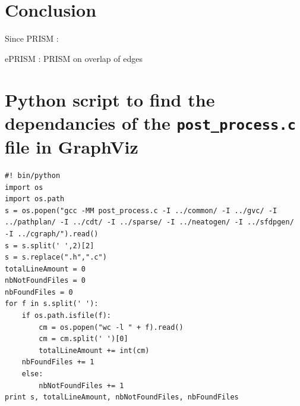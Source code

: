 \documentclass[12pt]{report}
\begin{document}
\chapter{Conclusion}

Since PRISM :

ePRISM : PRISM on overlap of edges \cite{Hu09}

\appendix
\chapter{Python script to find the dependancies of the \texttt{post\_process.c} file in GraphViz}

\begin{verbatim}
#! bin/python
import os
import os.path
s = os.popen("gcc -MM post_process.c -I ../common/ -I ../gvc/ -I 
../pathplan/ -I ../cdt/ -I ../sparse/ -I ../neatogen/ -I ../sfdpgen/ 
-I ../cgraph/").read()
s = s.split(' ',2)[2]
s = s.replace(".h",".c")
totalLineAmount = 0
nbNotFoundFiles = 0
nbFoundFiles = 0
for f in s.split(' '):
    if os.path.isfile(f):
        cm = os.popen("wc -l " + f).read()
        cm = cm.split(' ')[0]
        totalLineAmount += int(cm)
	nbFoundFiles += 1
    else:
        nbNotFoundFiles += 1
print s, totalLineAmount, nbNotFoundFiles, nbFoundFiles
\end{verbatim}



\end{document}
